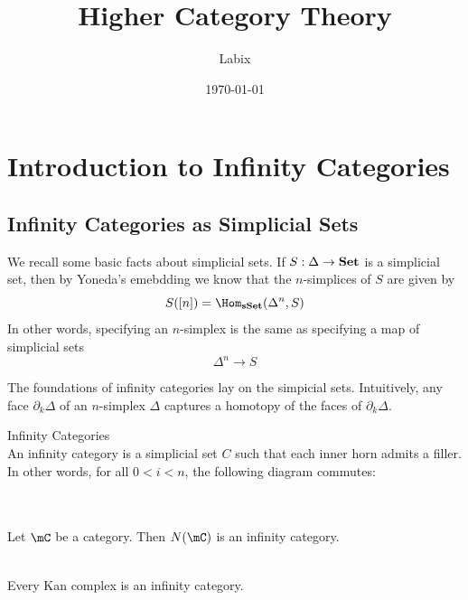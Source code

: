 \documentclass[a4paper]{article}
\title{Higher Category Theory}
\author{Labix}
\date{\today}
\begin{document}
\maketitle
\begin{abstract}
\begin{itemize}
\end{itemize}
\end{abstract}
\pagebreak
\tableofcontents

\pagebreak
\section{Introduction to Infinity Categories}
\subsection{Infinity Categories as Simplicial Sets}
We recall some basic facts about simplicial sets. If $S:\Delta\to\bold{Set}$ is a simplicial set, then by Yoneda's emebdding we know that the $n$-simplices of $S$ are given by $$S([n])=\Hom_\bold{sSet}(\Delta^n,S)$$ In other words, specifying an $n$-simplex is the same as specifying a map of simplicial sets $$\Delta^n\to S$$

The foundations of infinity categories lay on the simpicial sets. Intuitively, any face $\partial_k\Delta$ of an $n$-simplex $\Delta$ captures a homotopy of the faces of $\partial_k\Delta$. 

\begin{defn}{Infinity Categories}{}\\ An infinity category is a simplicial set $C$ such that each inner horn admits a filler. In other words, for all $0<i<n$, the following diagram commutes: \\
\\
\end{defn}

\begin{lmm}{}{}\\ Let $\mC$ be a category. Then $N(\mC)$ is an infinity category. 
\end{lmm}

\begin{lmm}{}{}\\ Every Kan complex is an infinity category. 
\end{lmm}
\end{document}
